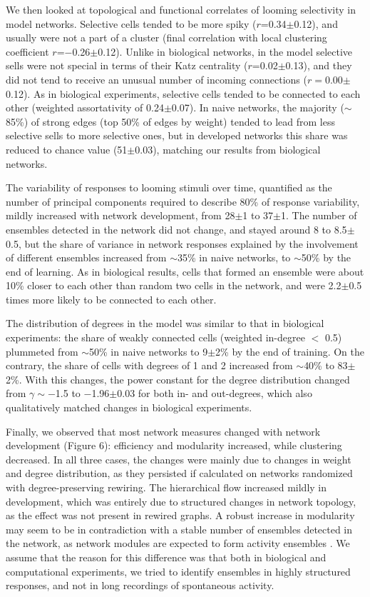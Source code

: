 \documentclass{article}
\begin{document}
We then looked at topological and functional correlates of looming selectivity in model networks. Selective cells tended to be more spiky ($r$=0.34$\pm$0.12), and usually were not a part of a cluster (final correlation with local clustering coefficient $r$=$-$0.26$\pm$0.12). Unlike in biological networks, in the model selective sells were not special in terms of their Katz centrality ($r$=0.02$\pm$0.13), and they did not tend to receive an unusual number of incoming connections ($r=$0.00$\pm$0.12). As in biological experiments, selective cells tended to be connected to each other (weighted assortativity of 0.24$\pm$0.07). In naive networks, the majority ($\sim$85\%) of strong edges (top 50\% of edges by weight) tended to lead from less selective sells to more selective ones, but in developed networks this share was reduced to chance value (51$\pm$0.03), matching our results from biological networks.

The variability of responses to looming stimuli over time, quantified as the number of principal components required to describe 80\% of response variability, mildly increased with network development, from 28$\pm$1 to 37$\pm$1. The number of ensembles detected in the network did not change, and stayed around 8 to 8.5$\pm$0.5, but the share of variance in network responses explained by the involvement of different ensembles increased from $\sim$35\% in naive networks, to $\sim$50\% by the end of learning. As in biological results, cells that formed an ensemble were about 10\% closer to each other than random two cells in the network, and were 2.2$\pm$0.5 times more likely to be connected to each other.

The distribution of degrees in the model was similar to that in biological experiments: the share of weakly connected cells (weighted in-degree $<$ 0.5) plummeted from $\sim$50\% in naive networks to 9$\pm$2\% by the end of training. On the contrary, the share of cells with degrees of 1 and 2 increased from $\sim$40\% to 83$\pm$2\%. With this changes, the power constant for the degree distribution changed from $\gamma \sim -$1.5 to $-$1.96$\pm$0.03 for both in- and out-degrees, which also qualitatively matched changes in biological experiments.

Finally, we observed that most network measures changed with network development (Figure 6): efficiency and modularity increased, while clustering decreased. In all three cases, the changes were mainly due to changes in weight and degree distribution, as they persisted if calculated on networks randomized with degree-preserving rewiring. The hierarchical flow increased mildly in development, which was entirely due to structured changes in network topology, as the effect was not present in rewired graphs. A robust increase in modularity may seem to be in contradiction with a stable number of ensembles detected in the network, as network modules are expected to form activity ensembles \citep{triplett2018emergence}. We assume that the reason for this difference was that both in biological and computational experiments, we tried to identify ensembles in highly structured responses, and not in long recordings of spontaneous activity.
\end{document}
